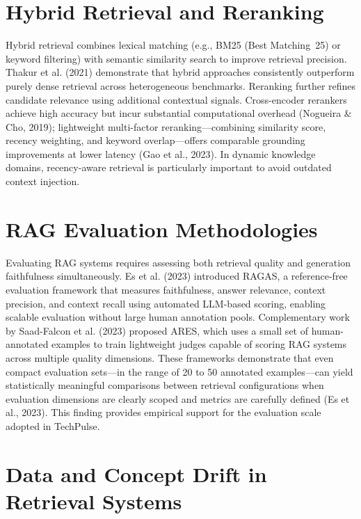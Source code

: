 \section{Hybrid Retrieval and Reranking}
\label{sec:lit_hybrid}

Hybrid retrieval combines lexical matching (e.g., BM25 (Best Matching~25) or keyword filtering) with semantic similarity search to improve retrieval precision. Thakur et al. (2021) demonstrate that hybrid approaches consistently outperform purely dense retrieval across heterogeneous benchmarks. Reranking further refines candidate relevance using additional contextual signals. Cross-encoder rerankers achieve high accuracy but incur substantial computational overhead (Nogueira \& Cho, 2019); lightweight multi-factor reranking---combining similarity score, recency weighting, and keyword overlap---offers comparable grounding improvements at lower latency (Gao et al., 2023). In dynamic knowledge domains, recency-aware retrieval is particularly important to avoid outdated context injection.

\section{RAG Evaluation Methodologies}
\label{sec:lit_eval}

Evaluating RAG systems requires assessing both retrieval quality and generation faithfulness simultaneously. Es et al. (2023) introduced RAGAS, a reference-free evaluation framework that measures faithfulness, answer relevance, context precision, and context recall using automated LLM-based scoring, enabling scalable evaluation without large human annotation pools. Complementary work by Saad-Falcon et al. (2023) proposed ARES, which uses a small set of human-annotated examples to train lightweight judges capable of scoring RAG systems across multiple quality dimensions. These frameworks demonstrate that even compact evaluation sets---in the range of 20 to 50 annotated examples---can yield statistically meaningful comparisons between retrieval configurations when evaluation dimensions are clearly scoped and metrics are carefully defined (Es et al., 2023). This finding provides empirical support for the evaluation scale adopted in TechPulse.

\section{Data and Concept Drift in Retrieval Systems}
\label{sec:lit_drift}


